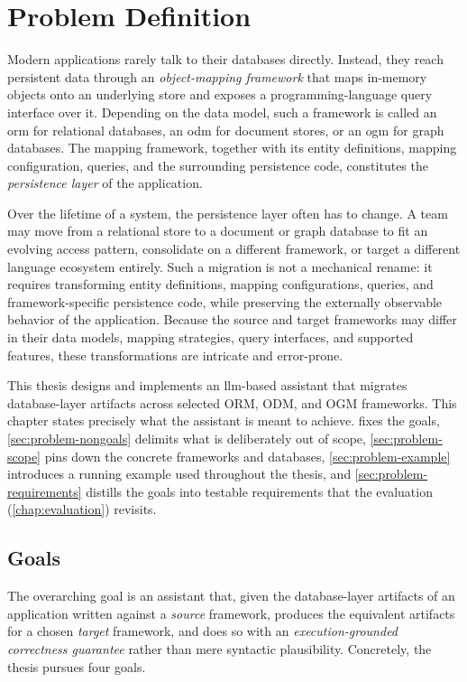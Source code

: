 \chapter{Problem Definition}
\label{chap:problem}

Modern applications rarely talk to their databases directly. Instead, they reach persistent data through an \emph{object-mapping framework} that maps in-memory objects onto an underlying store and exposes a programming-language query interface over it. Depending on the data model, such a framework is called an \Acrfull{orm} for relational databases, an \Acrfull{odm} for document stores, or an \Acrfull{ogm} for graph databases. The mapping framework, together with its entity definitions, mapping configuration, queries, and the surrounding persistence code, constitutes the \emph{persistence layer} of the application.

Over the lifetime of a system, the persistence layer often has to change. A team may move from a relational store to a document or graph database to fit an evolving access pattern, consolidate on a different framework, or target a different language ecosystem entirely. Such a migration is not a mechanical rename: it requires transforming entity definitions, mapping configurations, queries, and framework-specific persistence code, while preserving the externally observable behavior of the application. Because the source and target frameworks may differ in their data models, mapping strategies, query interfaces, and supported features, these transformations are intricate and error-prone.

This thesis designs and implements an \Acrfull{llm}-based assistant that migrates database-layer artifacts across selected ORM, ODM, and OGM frameworks. This chapter states precisely what the assistant is meant to achieve.  fixes the goals, \cref{sec:problem-nongoals} delimits what is deliberately out of scope, \cref{sec:problem-scope} pins down the concrete frameworks and databases, \cref{sec:problem-example} introduces a running example used throughout the thesis, and \cref{sec:problem-requirements} distills the goals into testable requirements that the evaluation (\cref{chap:evaluation}) revisits.

\section{Goals}
\label{sec:problem-goals}

The overarching goal is an assistant that, given the database-layer artifacts of an application written against a \emph{source} framework, produces the equivalent artifacts for a chosen \emph{target} framework, and does so with an \emph{execution-grounded correctness guarantee} rather than mere syntactic plausibility. Concretely, the thesis pursues four goals.

